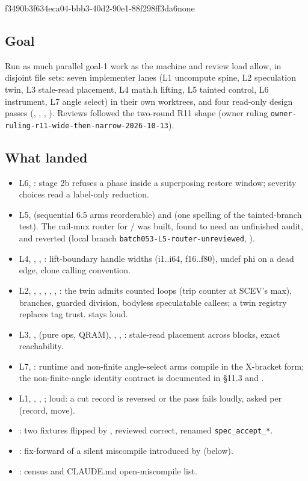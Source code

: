 %
  {f3490b3f}{634eca04-bbb3-40d2-90e1-88f298ff3da6}{none}

\subsection*{Goal}
Run as much parallel goal-1 work as the machine and review load allow, in disjoint file sets: seven implementer lanes (L1 uncompute spine, L2 speculation twin, L3 stale-read placement, L4 math.h lifting, L5 tainted control, L6 instrument, L7 angle select) in their own worktrees, and four read-only design passes (, , , ). Reviews followed the two-round R11 shape (owner ruling \texttt{owner-ruling-r11-wide-then-narrow-2026-10-13}).

\subsection*{What landed}
\begin{itemize}
\item {} L6, : stage 2b refuses a phase inside a superposing restore window; severity choices read a label-only reduction.
\item {} L5,  (sequential 6.5 arms reorderable) and  (one spelling of the tainted-branch test). The rail-mux router for / was built, found to need an unfinished audit, and reverted (local branch \texttt{batch053-L5-router-unreviewed}, ).
\item {} L4, , , : lift-boundary handle widths (i1..i64, f16..f80), undef phi on a dead edge, clone calling convention.
\item {} L2, , , , , , : the twin admits counted loops (trip counter at SCEV's max), branches, guarded division, bodyless speculatable callees; a twin registry replaces tag trust.  stays loud.
\item {} L3, ,  (pure ops, QRAM), , , : stale-read placement across blocks, exact reachability.
\item {} L7, : runtime and non-finite angle-select arms compile in the X-bracket form; the non-finite-angle identity contract is documented in  \S11.3 and .
\item {} L1, , , ;  loud: a cut record is reversed or the pass fails loudly, asked per (record, move).
\item {}: two fixtures flipped by , reviewed correct, renamed \texttt{spec\_accept\_*}.
\item {}: fix-forward of a silent miscompile introduced by  (below).
\item {}: census and CLAUDE.md open-miscompile list.
\end{itemize}

